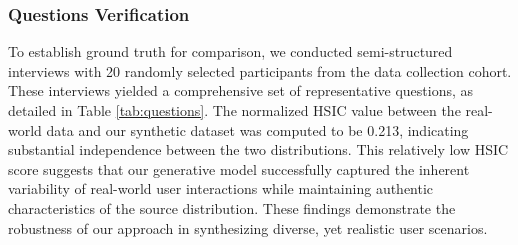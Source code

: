 \documentclass[preprint,12pt]{elsarticle}
\begin{document}
\subsubsection{Questions Verification}
To establish ground truth for comparison, we conducted semi-structured interviews with 20 randomly selected participants from the data collection cohort. These interviews yielded a comprehensive set of representative questions, as detailed in Table \ref{tab:questions}.
The normalized HSIC value between the real-world data and our synthetic dataset was computed to be 0.213, indicating substantial independence between the two distributions. This relatively low HSIC score suggests that our generative model successfully captured the inherent variability of real-world user interactions while maintaining authentic characteristics of the source distribution. These findings demonstrate the robustness of our approach in synthesizing diverse, yet realistic user scenarios.
\end{document}
